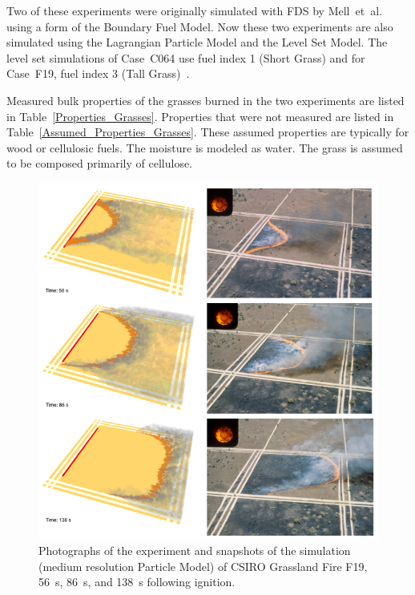 \documentclass[journal,article,atmosphere,submit,moreauthors,pdftex]{Definitions/mdpi}
\begin{document}
Two of these experiments were originally simulated with FDS by Mell~et~al.~\cite{Mell:IJWF2007} using a form of the Boundary Fuel Model. Now these two experiments are also simulated using the Lagrangian Particle Model and the Level Set Model. The level set simulations of Case~C064 use fuel index 1 (Short Grass) and for Case~F19, fuel index 3 (Tall Grass)~\cite{Rothermel:1972,Albini:1976}.

Measured bulk properties of the grasses burned in the two experiments are listed in Table~\ref{Properties_Grasses}. Properties that were not measured are listed in Table~\ref{Assumed_Properties_Grasses}. These assumed properties are typically for wood or cellulosic fuels. The moisture is modeled as water. The grass is assumed to be composed primarily of cellulose.

\begin{figure}[p]
\includegraphics[width=\textwidth]{figures/F19_collage.png}
\caption{Photographs of the experiment and snapshots of the simulation (medium resolution Particle Model) of CSIRO Grassland Fire F19, 56~s, 86~s, and 138~s following ignition.}
\label{F19}
\end{figure}
\end{document}

